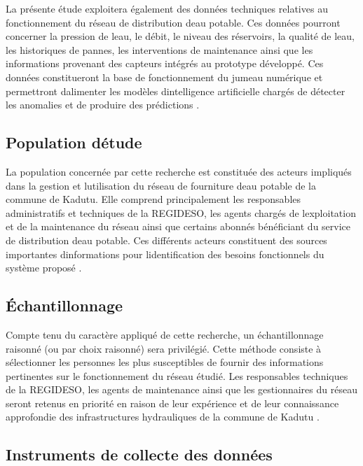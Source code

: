 La présente étude exploitera également des données techniques relatives
au fonctionnement du réseau de distribution d\textquotesingle eau
potable. Ces données pourront concerner la pression de
l\textquotesingle eau, le débit, le niveau des réservoirs, la qualité de
l\textquotesingle eau, les historiques de pannes, les interventions de
maintenance ainsi que les informations provenant des capteurs intégrés
au prototype développé. Ces données constitueront la base de
fonctionnement du jumeau numérique et permettront
d\textquotesingle alimenter les modèles d\textquotesingle intelligence
artificielle chargés de détecter les anomalies et de produire des
prédictions \cite{ref20}.

\subsection{Population d\textquotesingle étude}\label{population-duxe9tude}

La population concernée par cette recherche est constituée des acteurs
impliqués dans la gestion et l\textquotesingle utilisation du réseau de
fourniture d\textquotesingle eau potable de la commune de Kadutu. Elle
comprend principalement les responsables administratifs et techniques de
la REGIDESO, les agents chargés de l\textquotesingle exploitation et de
la maintenance du réseau ainsi que certains abonnés bénéficiant du
service de distribution d\textquotesingle eau potable. Ces différents
acteurs constituent des sources importantes
d\textquotesingle informations pour l\textquotesingle identification des
besoins fonctionnels du système proposé \cite{ref112}.

\subsection{Échantillonnage}\label{uxe9chantillonnage}

Compte tenu du caractère appliqué de cette recherche, un échantillonnage
raisonné (ou par choix raisonné) sera privilégié. Cette méthode consiste
à sélectionner les personnes les plus susceptibles de fournir des
informations pertinentes sur le fonctionnement du réseau étudié. Les
responsables techniques de la REGIDESO, les agents de maintenance ainsi
que les gestionnaires du réseau seront retenus en priorité en raison de
leur expérience et de leur connaissance approfondie des infrastructures
hydrauliques de la commune de Kadutu \cite{ref113}.

\subsection{Instruments de collecte des données}\label{instruments-de-collecte-des-donnuxe9es}

